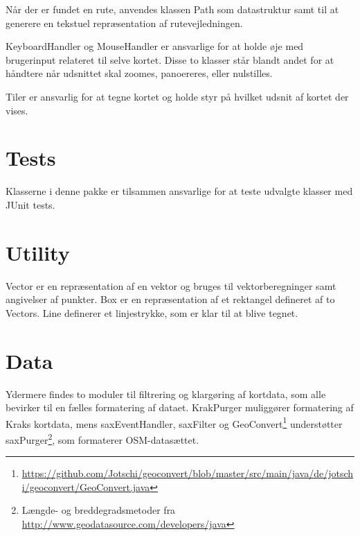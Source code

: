 Når der er fundet en rute, anvendes klassen Path som datastruktur samt til at generere en tekstuel repræsentation af rutevejledningen.

KeyboardHandler og MouseHandler er ansvarlige for at holde øje med brugerinput relateret til selve kortet. Disse to klasser står blandt andet for at håndtere når udsnittet skal zoomes, panoereres, eller nulstilles.

Tiler er ansvarlig for at tegne kortet og holde styr på hvilket udsnit af kortet der vises.

\section{Tests}
\label{sec:tests}

Klasserne i denne pakke er tilsammen ansvarlige for at teste udvalgte klasser med JUnit tests.

\section{Utility}

Vector er en repræsentation af en vektor og bruges til vektorberegninger samt angivelser af punkter. Box er en repræsentation af et rektangel defineret af to Vectors. Line definerer et linjestrykke, som er klar til at blive tegnet.

\section{Data}

Ydermere findes to moduler til filtrering og klargøring af kortdata, som alle bevirker til en fælles formatering af dataet. KrakPurger muliggører formatering af Kraks kortdata, mens saxEventHandler, saxFilter og GeoConvert\footnote{\url{https://github.com/Jotschi/geoconvert/blob/master/src/main/java/de/jotschi/geoconvert/GeoConvert.java}} understøtter saxPurger\footnote{Længde- og breddegradsmetoder fra \url{http://www.geodatasource.com/developers/java}}, som formaterer OSM-datasættet.